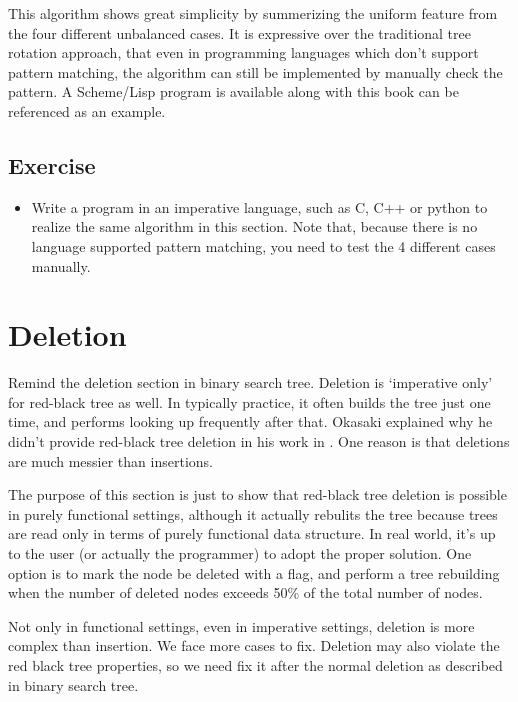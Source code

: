 \documentclass{article}
\begin{document}
This algorithm shows great simplicity by summerizing the uniform feature
from the four different unbalanced cases. It is expressive over
the traditional tree rotation approach, that even in programming languages
which don't support pattern matching, the algorithm can still be
implemented by manually check the pattern. A Scheme/Lisp program
is available along with this book can be referenced as an example.

\subsection*{Exercise}

\begin{itemize}
\item Write a program in an imperative language, such as
C, C++ or python to realize the same algorithm in this
section. Note that, because there is no language supported
pattern matching, you need to test the 4 different cases
manually.
\end{itemize}


\section{Deletion}

Remind the deletion section in binary search tree. Deletion is 
`imperative only' for red-black tree as well. In typically
practice, it often builds the tree just one time, and 
performs looking up frequently after that. Okasaki explained
why he didn't provide red-black tree deletion in his work
in \cite{okasaki-blog}. One reason is that deletions are
much messier than insertions.

The purpose of this section is just to show that red-black
tree deletion is possible in purely functional settings, 
although it actually rebulits the tree because trees are
read only in terms of purely functional data structure.
In real world, it's up to the user (or actually the 
programmer) to adopt the proper solution. One option is to mark
the node be deleted with a flag, and perform a tree rebuilding
when the number of deleted nodes exceeds 50\% of the total number
of nodes.

Not only in functional settings, even in imperative settings, 
deletion is more complex than insertion. We face more cases 
to fix. Deletion may also violate the red black tree properties,
so we need fix it after the normal deletion as described 
in binary search tree.
\end{document}
